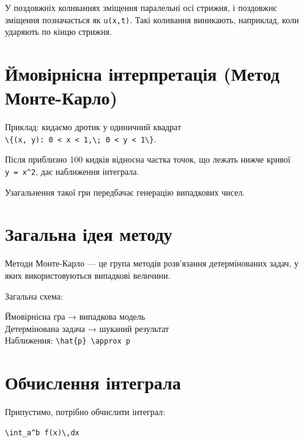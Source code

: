 \documentclass[
  ukrainian,
]{article}
\begin{document}
У поздовжніх коливаннях зміщення паралельні осі стрижня, і поздовжнє
зміщення позначається як \texttt{u(x,t)}. Такі коливання виникають,
наприклад, коли ударяють по кінцю стрижня.

\section{Ймовірнісна інтерпретація (Метод
Монте-Карло)}\label{ux439ux43cux43eux432ux456ux440ux43dux456ux441ux43dux430-ux456ux43dux442ux435ux440ux43fux440ux435ux442ux430ux446ux456ux44f-ux43cux435ux442ux43eux434-ux43cux43eux43dux442ux435-ux43aux430ux440ux43bux43e}

Приклад: кидаємо дротик у одиничний квадрат\\
\texttt{\textbackslash{}\{(x,\ y):\ 0\ \textless{}\ x\ \textless{}\ 1,\textbackslash{};\ 0\ \textless{}\ y\ \textless{}\ 1\textbackslash{}\}}.

Після приблизно 100 кидків відносна частка точок, що лежать нижче кривої
\texttt{y\ =\ x\^{}2}, дає наближення інтеграла.

Узагальнення такої гри передбачає генерацію випадкових чисел.

\section{Загальна ідея
методу}\label{ux437ux430ux433ux430ux43bux44cux43dux430-ux456ux434ux435ux44f-ux43cux435ux442ux43eux434ux443}

Методи Монте-Карло --- це група методів розв'язання детермінованих
задач, у яких використовуються випадкові величини.

Загальна схема:

Ймовірнісна гра → випадкова модель\\
Детермінована задача → шуканий результат\\
Наближення: \texttt{\textbackslash{}hat\{p\}\ \textbackslash{}approx\ p}

\section{Обчислення
інтеграла}\label{ux43eux431ux447ux438ux441ux43bux435ux43dux43dux44f-ux456ux43dux442ux435ux433ux440ux430ux43bux430}

Припустимо, потрібно обчислити інтеграл:

\begin{verbatim}
\int_a^b f(x)\,dx
\end{verbatim}
\end{document}
